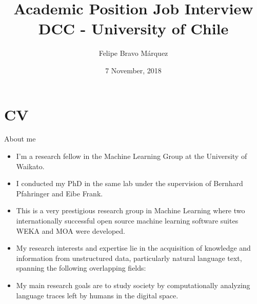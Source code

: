 \documentclass[handout]{beamer}
\title{Academic Position Job Interview\\ DCC - University of Chile}
\author[Felipe Bravo Márquez]{Felipe Bravo Márquez}
\date{7 November, 2018}
\begin{document}
\begin{frame}
\titlepage


\end{frame}




\section{CV}


\begin{frame}{About me}
\begin{scriptsize}
\begin{itemize}
 \item I'm a research fellow in the Machine Learning Group at the University of Waikato. 
 \item I conducted my PhD in the same lab under the supervision of Bernhard Pfahringer and Eibe Frank.
 \item This is a very prestigious research group in Machine Learning where two internationally successful open source machine learning software suites WEKA and MOA were developed. 
 \item My research interests and expertise lie in the acquisition of knowledge and information from unstructured data, particularly natural language text, spanning the following overlapping fields:
\begin{enumerate}
\end{enumerate}

\item My main research goals are to study society by computationally analyzing language traces left by humans in the digital space.  

\end{itemize}


\end{scriptsize}

\end{frame}
\end{document}
